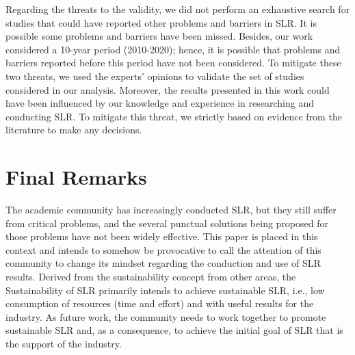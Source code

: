 \documentclass{article}
\begin{document}

Regarding the threats to the validity, %
we did not perform an exhaustive search for studies that could have reported other problems and barriers in SLR. 
It is possible 
some problems and barriers have been missed. Besides, our work considered a 10-year period (2010-2020); hence, it is possible that problems and barriers reported before this period have not been considered. To mitigate these two threats, we used the experts' opinions to validate the set of studies considered in our analysis. Moreover, the results presented in this work could have been influenced by our knowledge and experience in researching and conducting SLR. To mitigate this threat, we strictly based on evidence from the literature to make any decisions.

\section{Final Remarks}
\label{sec:conclusion}


The academic community has increasingly conducted SLR, but they still suffer from critical problems, and the several punctual solutions being proposed for those problems have not been widely effective. This paper is placed in this context and intends to somehow be provocative to call the attention of this community to change its mindset regarding the conduction and use of SLR results. 
%
Derived from the sustainability concept from other areas, the Sustainability of SLR primarily intends to achieve sustainable SLR, i.e., low consumption of resources (time and effort) and with useful results for the industry. As future work, the community needs to work together to promote sustainable SLR and, as a consequence, to achieve the initial goal of SLR that is the support of the industry.
\end{document}
